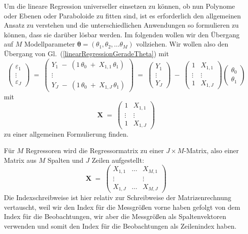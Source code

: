 Um die lineare Regression universeller einsetzen zu können, ob nun Polynome oder
Ebenen oder Paraboloide zu fitten sind, ist es erforderlich den allgemeinen Ansatz zu verstehen
und die unterschiedlichen Anwendungen so formulieren zu können, dass sie darüber lösbar werden. Im folgenden wollen wir den Übergang auf $M$ Modellparameter 
$\boldsymbol{\theta} = (\theta_1, \theta_2, \ldots \theta_M)$ vollziehen.
Wir wollen also den Übergang von Gl.~(\ref{linearRegressionGeradeTheta}) mit
\begin{equation*}
\left(
\begin{array}{c}
\varepsilon_1\\
\vdots \\
\varepsilon_J
\end{array}
\right)  \; = \;
\left(
\begin{array}{c}
 Y_{1} \; - \; (1 \, \theta_0 \; + \;  X_{1,1} \, \theta_1)\\
\vdots \\
 Y_{J} \; - \; (1 \, \theta_0 \; + \;  X_{1,J} \, \theta_1)
\end{array}
\right) \; = \;
\left(
\begin{array}{c}
 Y_{1}\\
\vdots \\
 Y_{J}
\end{array}
\right) 
\; - \; 
\left(
\begin{array}{cc}
 1 &  X_{1,1} \\
\vdots & \vdots\\
 1 & X_{1,J} 
\end{array}
\right) 
\left(
\begin{array}{c}
\theta_0\\
\theta_1
\end{array}
\right)
\end{equation*}
mit
\begin{equation*}
\mathbf{X} \; = \;
\left(
\begin{array}{cc}
 1 &  X_{1,1} \\
\vdots & \vdots\\
 1 & X_{1,J} 
\end{array}
\right)
\end{equation*}
zu einer allgemeinen Formulierung finden.

Für $M$ Regressoren wird die Regressormatrix zu einer $J \times M$-Matrix, also einer Matrix
aus $M$ Spalten und $J$ Zeilen aufgestellt:
\begin{equation}
\mathbf{X} \; = \;
\left(
\begin{array}{ccc}
 X_{1,1} & \dots &  X_{M,1} \\
\vdots & & \vdots \\
 X_{1,J}  & \dots &  X_{M,J}
\end{array}
\right)
\end{equation}
Die Indexschreibweise ist hier relativ zur Schreibweise der Matrizenrechnung vertauscht, weil wir den Index für die
Messgrößen vorne haben gefolgt von dem Index für die Beobachtungen, wir aber die Messgrößen als
Spaltenvektoren verwenden und somit den Index für die Beobachtungen als Zeilenindex haben.

